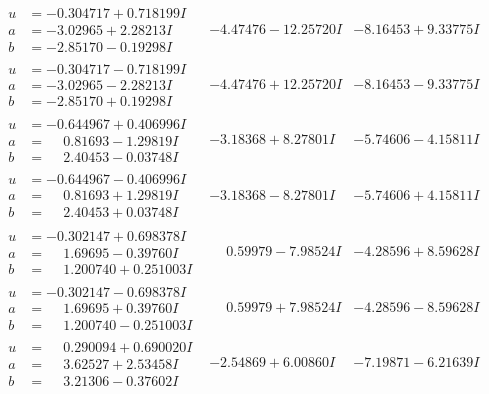 \documentclass[1p]{elsarticle_modified}
\theoremstyle{definition}
\begin{document}
$$\begin{array}{c|c|c}
\begin{aligned}
u &= -0.304717 + 0.718199 I \\
a &= -3.02965 + 2.28213 I \\
b &= -2.85170 - 0.19298 I\end{aligned}
 & -4.47476 - 12.25720 I & -8.16453 + 9.33775 I \\ \hline\begin{aligned}
u &= -0.304717 - 0.718199 I \\
a &= -3.02965 - 2.28213 I \\
b &= -2.85170 + 0.19298 I\end{aligned}
 & -4.47476 + 12.25720 I & -8.16453 - 9.33775 I \\ \hline\begin{aligned}
u &= -0.644967 + 0.406996 I \\
a &= \phantom{-}0.81693 - 1.29819 I \\
b &= \phantom{-}2.40453 - 0.03748 I\end{aligned}
 & -3.18368 + 8.27801 I & -5.74606 - 4.15811 I \\ \hline\begin{aligned}
u &= -0.644967 - 0.406996 I \\
a &= \phantom{-}0.81693 + 1.29819 I \\
b &= \phantom{-}2.40453 + 0.03748 I\end{aligned}
 & -3.18368 - 8.27801 I & -5.74606 + 4.15811 I \\ \hline\begin{aligned}
u &= -0.302147 + 0.698378 I \\
a &= \phantom{-}1.69695 - 0.39760 I \\
b &= \phantom{-}1.200740 + 0.251003 I\end{aligned}
 & \phantom{-}0.59979 - 7.98524 I & -4.28596 + 8.59628 I \\ \hline\begin{aligned}
u &= -0.302147 - 0.698378 I \\
a &= \phantom{-}1.69695 + 0.39760 I \\
b &= \phantom{-}1.200740 - 0.251003 I\end{aligned}
 & \phantom{-}0.59979 + 7.98524 I & -4.28596 - 8.59628 I \\ \hline\begin{aligned}
u &= \phantom{-}0.290094 + 0.690020 I \\
a &= \phantom{-}3.62527 + 2.53458 I \\
b &= \phantom{-}3.21306 - 0.37602 I\end{aligned}
 & -2.54869 + 6.00860 I & -7.19871 - 6.21639 I \\ \hline\begin{aligned}

\end{aligned}
\end{array}$$
\end{document}
